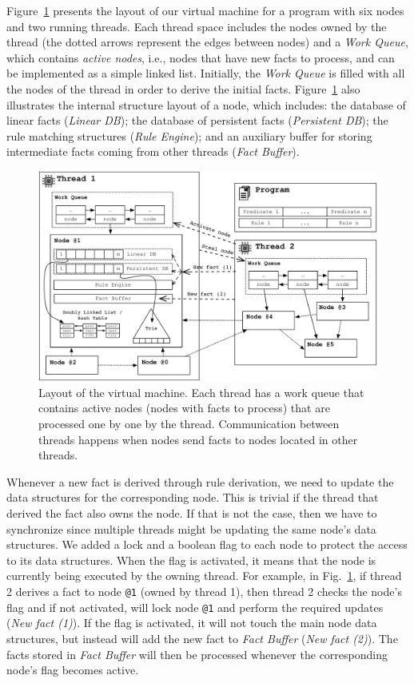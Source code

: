Figure~\ref{fig:implementation:vm_overview} presents the layout of our virtual
machine for a program with six nodes and two running threads. Each thread space
includes the nodes owned by the thread (the dotted arrows represent the edges
between nodes) and a \emph{Work Queue}, which contains \emph{active nodes},
i.e., nodes that have new facts to process, and can be implemented as a simple
linked list. Initially, the \emph{Work Queue} is filled with all the nodes of
the thread in order to derive the initial facts.
Figure~\ref{fig:implementation:vm_overview} also illustrates the internal
structure layout of a node, which includes: the database of linear facts
(\emph{Linear DB}); the database of persistent facts (\emph{Persistent DB}); the
rule matching structures (\emph{Rule Engine}); and an auxiliary buffer for
storing intermediate facts coming from other threads (\emph{Fact Buffer}).

\begin{figure}[t]
\centering
\includegraphics[width=\textwidth]{figures/implementation/vm_overview.pdf}
\caption{Layout of the virtual machine. Each thread has a work queue that
   contains active nodes (nodes with facts to process) that are processed one
   by one by the thread. Communication between threads happens when nodes
   send facts to nodes located in other threads.}
\label{fig:implementation:vm_overview}
\end{figure}

Whenever a new fact is derived through rule derivation, we need to update the
data structures for the corresponding node. This is trivial if the thread that
derived the fact also owns the node. If that is not the case, then we have to
synchronize since multiple threads might be updating the same node's data
structures. We added a lock and a boolean flag to each node to protect the
access to its data structures. When the flag is activated, it means that the
node is currently being executed by the owning thread. For example, in
Fig.~\ref{fig:implementation:vm_overview}, if thread 2 derives a fact to node
\texttt{@1} (owned by thread 1), then thread 2 checks the node's flag and if not
activated, will lock node \texttt{@1} and perform the required updates
(\emph{New fact (1)}). If the flag is activated, it will not touch the main node
data structures, but instead will add the new fact to \emph{Fact Buffer}
(\emph{New fact (2)}). The facts stored in \emph{Fact Buffer} will then be
processed whenever the corresponding node's flag becomes active.

